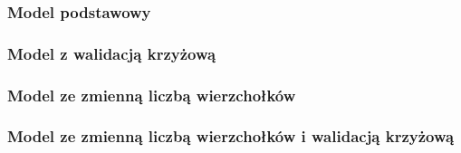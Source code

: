 \subsubsection{Model podstawowy}


\subsubsection{Model z walidacją krzyżową}


\subsubsection{Model ze zmienną liczbą wierzchołków}


\subsubsection{Model ze zmienną liczbą wierzchołków i walidacją krzyżową}
